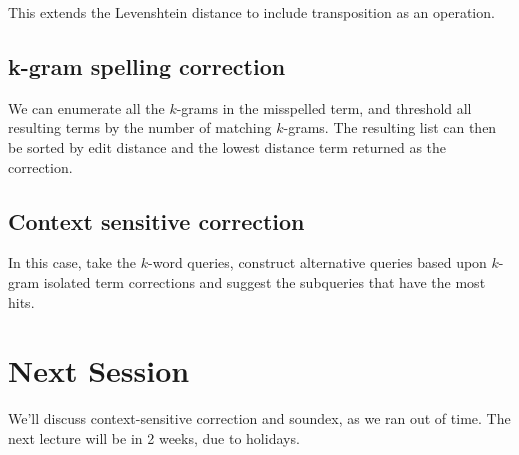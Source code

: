 \documentclass{idc_msc}
\begin{document}
This extends the Levenshtein distance to include transposition as an operation.

\subsection{k-gram spelling correction}

We can enumerate all the \(k\)-grams in the misspelled term, and threshold all resulting terms by the number of matching \(k\)-grams.
The resulting list can then be sorted by edit distance and the lowest distance term returned as the correction.

\subsection{Context sensitive correction}

In this case, take the \(k\)-word queries, construct alternative queries based upon \(k\)-gram isolated term corrections and suggest the subqueries that have the most hits.

\section{Next Session}

We'll discuss context-sensitive correction and soundex, as we ran out of time.
The next lecture will be in 2 weeks, due to holidays.
\end{document}
